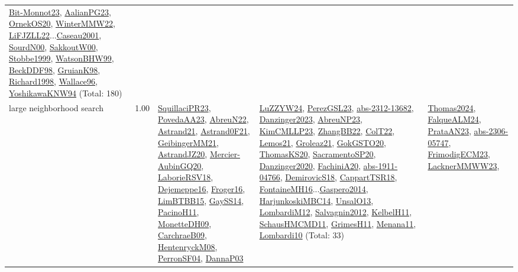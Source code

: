 {\begin{longtable}{p{3cm}r>{\raggedright\arraybackslash}p{6cm}>{\raggedright\arraybackslash}p{6cm}>{\raggedright\arraybackslash}p{8cm}}
\hyperref[detail:Bit-Monnot23]{Bit-Monnot23}, \hyperref[detail:AalianPG23]{AalianPG23}, \hyperref[detail:OrnekOS20]{OrnekOS20}, \hyperref[detail:WinterMMW22]{WinterMMW22}, \hyperref[detail:LiFJZLL22]{LiFJZLL22}...\hyperref[detail:Caseau2001]{Caseau2001}, \hyperref[detail:SourdN00]{SourdN00}, \hyperref[detail:SakkoutW00]{SakkoutW00}, \hyperref[detail:Stobbe1999]{Stobbe1999}, \hyperref[detail:WatsonBHW99]{WatsonBHW99}, \hyperref[detail:BeckDDF98]{BeckDDF98}, \hyperref[detail:GruianK98]{GruianK98}, \hyperref[detail:Richard1998]{Richard1998}, \hyperref[detail:Wallace96]{Wallace96}, \hyperref[detail:YoshikawaKNW94]{YoshikawaKNW94} (Total: 180)\\
\index{large neighborhood search}\index{Algorithms!large neighborhood search}large neighborhood search &  1.00 & \hyperref[detail:SquillaciPR23]{SquillaciPR23}, \hyperref[detail:PovedaAA23]{PovedaAA23}, \hyperref[detail:AbreuN22]{AbreuN22}, \hyperref[detail:Astrand21]{Astrand21}, \hyperref[detail:Astrand0F21]{Astrand0F21}, \hyperref[detail:GeibingerMM21]{GeibingerMM21}, \hyperref[detail:AstrandJZ20]{AstrandJZ20}, \hyperref[detail:Mercier-AubinGQ20]{Mercier-AubinGQ20}, \hyperref[detail:LaborieRSV18]{LaborieRSV18}, \hyperref[detail:Dejemeppe16]{Dejemeppe16}, \hyperref[detail:Froger16]{Froger16}, \hyperref[detail:LimBTBB15]{LimBTBB15}, \hyperref[detail:GaySS14]{GaySS14}, \hyperref[detail:PacinoH11]{PacinoH11}, \hyperref[detail:MonetteDH09]{MonetteDH09}, \hyperref[detail:CarchraeB09]{CarchraeB09}, \hyperref[detail:HentenryckM08]{HentenryckM08}, \hyperref[detail:PerronSF04]{PerronSF04}, \hyperref[detail:DannaP03]{DannaP03} & \hyperref[detail:LuZZYW24]{LuZZYW24}, \hyperref[detail:PerezGSL23]{PerezGSL23}, \hyperref[detail:abs-2312-13682]{abs-2312-13682}, \hyperref[detail:Danzinger2023]{Danzinger2023}, \hyperref[detail:AbreuNP23]{AbreuNP23}, \hyperref[detail:KimCMLLP23]{KimCMLLP23}, \hyperref[detail:ZhangBB22]{ZhangBB22}, \hyperref[detail:ColT22]{ColT22}, \hyperref[detail:Lemos21]{Lemos21}, \hyperref[detail:Groleaz21]{Groleaz21}, \hyperref[detail:GokGSTO20]{GokGSTO20}, \hyperref[detail:ThomasKS20]{ThomasKS20}, \hyperref[detail:SacramentoSP20]{SacramentoSP20}, \hyperref[detail:Danzinger2020]{Danzinger2020}, \hyperref[detail:FachiniA20]{FachiniA20}, \hyperref[detail:abs-1911-04766]{abs-1911-04766}, \hyperref[detail:DemirovicS18]{DemirovicS18}, \hyperref[detail:CappartTSR18]{CappartTSR18}, \hyperref[detail:FontaineMH16]{FontaineMH16}...\hyperref[detail:Gaspero2014]{Gaspero2014}, \hyperref[detail:HarjunkoskiMBC14]{HarjunkoskiMBC14}, \hyperref[detail:UnsalO13]{UnsalO13}, \hyperref[detail:LombardiM12]{LombardiM12}, \hyperref[detail:Salvagnin2012]{Salvagnin2012}, \hyperref[detail:KelbelH11]{KelbelH11}, \hyperref[detail:SchausHMCMD11]{SchausHMCMD11}, \hyperref[detail:GrimesH11]{GrimesH11}, \hyperref[detail:Menana11]{Menana11}, \hyperref[detail:Lombardi10]{Lombardi10} (Total: 33) & \hyperref[detail:Thomas2024]{Thomas2024}, \hyperref[detail:FalqueALM24]{FalqueALM24}, \hyperref[detail:PrataAN23]{PrataAN23}, \hyperref[detail:abs-2306-05747]{abs-2306-05747}, \hyperref[detail:FrimodigECM23]{FrimodigECM23}, \hyperref[detail:LacknerMMWW23]{LacknerMMWW23}, 
\end{longtable}}
